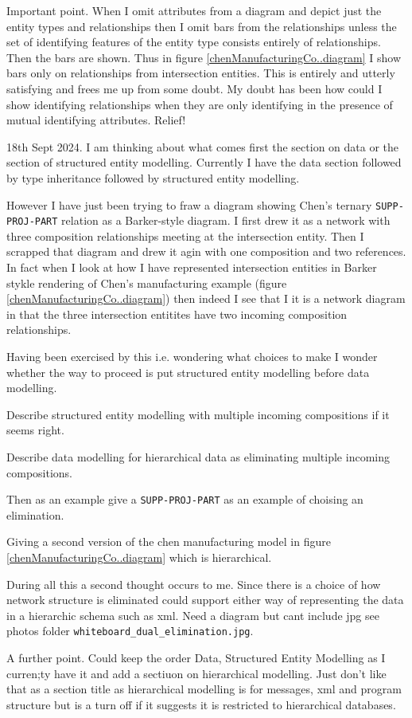 \begin{notebox}
Important point. When I omit attributes from a diagram and depict just the entity types and relationships then I omit bars from the relationships unless the set of identifying features of the entity type consists entirely of relationships. Then the bars are shown.
Thus in figure \ref{chenManufacturingCo..diagram} I show bars only on relationships from intersection entities. This is entirely and utterly satisfying and frees me up from some doubt. My doubt has been how could I show identifying relationships when they are only identifying in the presence of 
mutual identifying attributes. Relief! 
\end{notebox}
\begin{noteforfuture}
18th Sept 2024. I am thinking about what comes first the section on data or the section of structured
entity modelling. 
Currently I have the data section followed by type inheritance followed by structured entity modelling. 

However I have just been trying to fraw a diagram showing Chen's ternary \verb'SUPP-PROJ-PART' relation as a Barker-style diagram. I first drew it as a network with three composition relationships meeting at the intersection entity. Then I scrapped that diagram and drew it agin with one composition and two references. In fact when I look at how I have represented intersection entities in Barker stykle rendering of Chen's manufacturing example (figure \ref{chenManufacturingCo..diagram}) then indeed I see that I it is a network diagram in that the three intersection entitites have two incoming composition relationships. 

Having been exercised by this i.e. wondering what choices to make I wonder whether the way to proceed is put structured entity modelling before data modelling.

Describe structured entity modelling with multiple incoming compositions if it seems right.

Describe data modelling for hierarchical data as eliminating multiple incoming compositions.

Then as an example give a \verb'SUPP-PROJ-PART' as an example of choising an elimination.

Giving a second version of the chen manufacturing model in figure \ref{chenManufacturingCo..diagram}
which is hierarchical.

During all this a second thought occurs to me. Since there is a choice of how network structure is eliminated could support either way of representing the data in a hierarchic schema such as xml.
 Need a diagram but cant include jpg see photos folder \verb'whiteboard_dual_elimination.jpg'.

A further point.
Could keep the order Data, Structured Entity Modelling as I curren;ty have it and add a sectiuon on hierarchical modelling. Just don't like that as a section title as hierarchical modelling is for messages, xml and program structure but is a turn off if it suggests it is restricted to hierarchical databases.

\end{noteforfuture}

